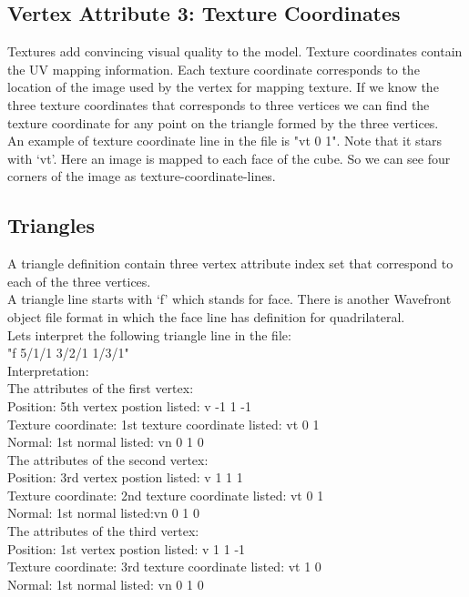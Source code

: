 \subsection{Vertex Attribute 3: Texture Coordinates}
Textures add convincing visual quality to the model. Texture coordinates contain the UV mapping information. Each texture coordinate corresponds to the  location of the image used by the vertex for mapping texture. If we know the three texture coordinates that corresponds to three vertices we can find the texture coordinate for any point on the triangle formed by the three vertices.\\An example of texture coordinate line in the file is "vt 0 1". Note that it stars with `vt'. Here an image is mapped to each face of the cube. So we can see four corners of the image as texture-coordinate-lines.
\subsection{Triangles}
A triangle definition contain three vertex attribute index set that correspond to each of the three vertices.\\A triangle line starts with `f' which stands for face. There is another Wavefront object file format in which the face line has definition for quadrilateral. \\Lets interpret the following triangle line in the file: \\
"f 5/1/1 3/2/1 1/3/1" \\
Interpretation:\\
The attributes of the first vertex:\\
Position: 5th  vertex postion listed: v -1 1 -1 \\
Texture coordinate: 1st texture coordinate listed: vt 0 1\\
Normal: 1st normal listed: vn 0 1 0\\

The attributes of the second vertex:\\
Position: 3rd  vertex postion listed: v 1 1 1\\
Texture coordinate: 2nd texture coordinate listed: vt 0 1\\
Normal: 1st normal listed:vn 0 1 0\\

The attributes of the third  vertex:\\
Position: 1st  vertex postion listed: v 1 1 -1\\
Texture coordinate: 3rd texture coordinate listed: vt 1 0\\
Normal: 1st normal listed: vn 0 1 0\\

